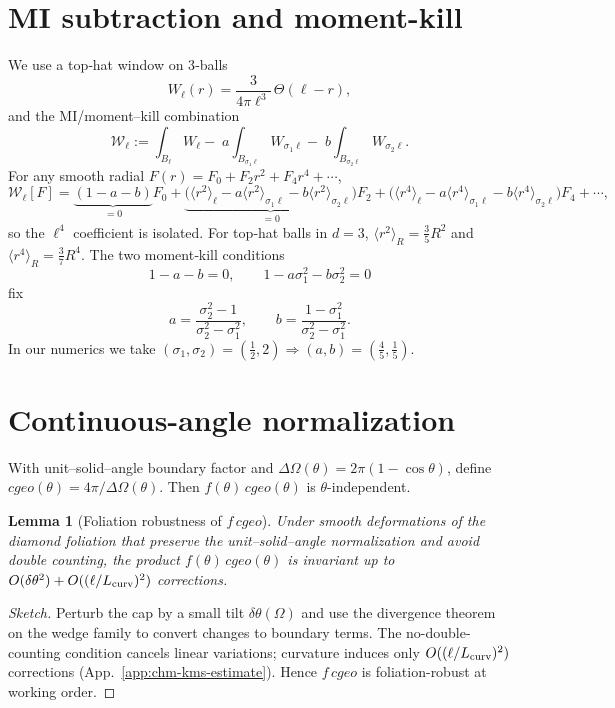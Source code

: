 \documentclass[aps,prd,onecolumn,superscriptaddress,nofootinbib]{revtex4-2}
\def\cgeo{cgeo}%
\def\Omega_\Lambda{OmegaLambda}%
\providecommand{\cgeo}{c_{\rm geo}}
\newtheorem{lemma}{Lemma}
\begin{document}
\section{MI subtraction and moment-kill}
\label{app:MI}
We use a top‑hat window on 3‑balls
\[
W_\ell(r)=\frac{3}{4\pi \ell^3}\,\Theta(\ell-r),
\]
and the MI/moment–kill combination
\[
\mathcal{W}_\ell:=\int_{B_\ell}\!W_\ell-\;a\!\int_{B_{\sigma_1\ell}}\!W_{\sigma_1\ell}-\;b\!\int_{B_{\sigma_2\ell}}\!W_{\sigma_2\ell}.
\]
For any smooth radial \(F(r)=F_0+F_2 r^2+F_4 r^4+\cdots\),
\[
\mathcal{W}_\ell[F]=\underbrace{(1-a-b)}_{=0}F_0+\underbrace{\Big(\langle r^2\rangle_\ell-a\langle r^2\rangle_{\sigma_1\ell}-b\langle r^2\rangle_{\sigma_2\ell}\Big)}_{=0}F_2+\Big(\langle r^4\rangle_\ell-a\langle r^4\rangle_{\sigma_1\ell}-b\langle r^4\rangle_{\sigma_2\ell}\Big)F_4+\cdots,
\]
so the \(\ell^4\) coefficient is isolated. For top‑hat balls in \(d{=}3\), \(\langle r^2\rangle_{R}=\tfrac{3}{5}R^2\) and \(\langle r^4\rangle_{R}=\tfrac{3}{7}R^4\). The two moment‑kill conditions
\[
1-a-b=0,\qquad 1-a\sigma_1^2-b\sigma_2^2=0
\]
fix
\[
a=\frac{\sigma_2^2-1}{\sigma_2^2-\sigma_1^2},\qquad b=\frac{1-\sigma_1^2}{\sigma_2^2-\sigma_1^2}.
\]
In our numerics we take \((\sigma_1,\sigma_2)=(\tfrac12,2)\Rightarrow (a,b)=(\tfrac45,\tfrac15)\).

\section{Continuous-angle normalization}
\label{app:angle}
With unit–solid–angle boundary factor and \(\Delta\Omega(\theta)=2\pi(1-\cos\theta)\), define \(\cgeo(\theta)=4\pi/\Delta\Omega(\theta)\). Then \(f(\theta)\,\cgeo(\theta)\) is \(\theta\)-independent.

\begin{lemma}[Foliation robustness of \(f\,\cgeo\)]
Under smooth deformations of the diamond foliation that preserve the unit–solid–angle normalization and avoid double counting, the product \(f(\theta)\,\cgeo(\theta)\) is invariant up to \(O(\delta\theta^2)+O((\ell/L_{\rm curv})^2)\) corrections.
\end{lemma}
\begin{proof}[Sketch]
Perturb the cap by a small tilt \(\delta\theta(\Omega)\) and use the divergence theorem on the wedge family to convert changes to boundary terms. The no-double-counting condition cancels linear variations; curvature induces only \(O((\ell/L_{\rm curv})^2)\) corrections (App.~\ref{app:chm-kms-estimate}). Hence \(f\,\cgeo\) is foliation-robust at working order.
\end{proof}
\end{document}
